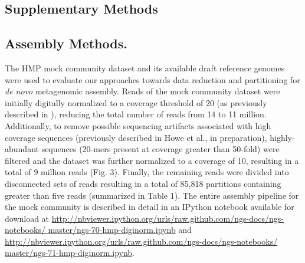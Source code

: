 \documentclass{pnastwo}
\begin{document}
\begin{article}
\section*{Supplementary Methods}
\subsection*{Assembly Methods.} The HMP mock community dataset and its available draft reference
genomes were used to evaluate our approaches towards data reduction
and partitioning for \emph{de novo} metagenomic assembly.  Reads of
the mock community dataset were initially digitally normalized to a
coverage threshold of 20 (as previously described in \cite{browndiginorm}),
reducing the total number of reads from 14 to 11 million.
Additionally, to remove possible sequencing artifacts associated with
high coverage sequences (previously described in Howe et al., in preparation),
highly-abundant sequences (20-mers present at coverage greater than
50-fold) were filtered and the dataset was further normalized to a
coverage of 10, resulting in a total of 9 million reads (Fig.
3).  Finally, the remaining reads were divided into
disconnected sets of reads resulting in a total of 85,818 partitions
containing greater than five reads (summarized in
Table 1).  The entire assembly pipeline for the mock community is described in
detail in an IPython notebook available for download at 
\url{http://nbviewer.ipython.org/urls/raw.github.com/ngs-docs/ngs-notebooks/
master/ngs-70-hmp-diginorm.ipynb}
and 
\url{http://nbviewer.ipython.org/urls/raw.github.com/ngs-docs/ngs-notebooks/
master/ngs-71-hmp-diginorm.ipynb}. 


\end{article}
\end{document}
